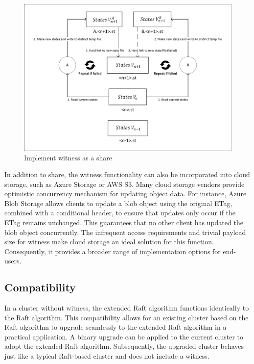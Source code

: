 \begin{figure}
    \includegraphics[width=1\textwidth, angle=0]{share-witness-implementation.pdf}
    \caption{Implement witness as a share}
    \label{fig:share-witness-implementation}
\end{figure}

In addition to share, the witness functionality can also be incorporated into cloud storage, such as Azure Storage or AWS S3. Many cloud storage vendors provide optimistic concurrency mechanism for updating object data. For instance, Azure Blob Storage allows clients to update a blob object using the original ETag, combined with a conditional header, to ensure that updates only occur if the ETag remains unchanged. This guarantees that no other client has updated the blob object concurrently. The infrequent access requirements and trivial payload size for witness make cloud storage an ideal solution for this function. Consequently, it provides a broader range of implementation options for end-users.



\subsection{Compatibility}\label{subsection:compatibility}
In a cluster without witness, the extended Raft algorithm functions identically to the Raft algorithm. This compatibility allows for an existing cluster based on the Raft algorithm to upgrade seamlessly to the extended Raft algorithm in a practical application. A binary upgrade can be applied to the current cluster to adopt the extended Raft algorithm. Subsequently, the upgraded cluster behaves just like a typical Raft-based cluster and does not include a witness.

